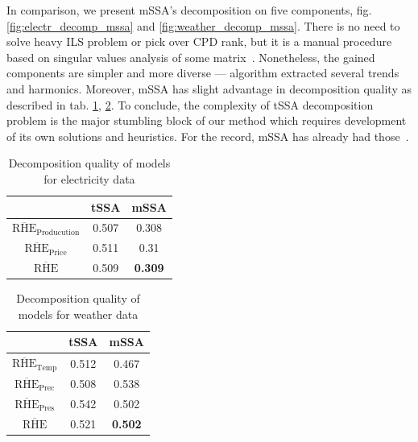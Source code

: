 	In comparison, we present mSSA's decomposition on five components,  fig. \ref{fig:electr_decomp_mssa} and \ref{fig:weather_decomp_mssa}. There is no need to solve heavy ILS problem or pick over CPD rank, but it is a manual procedure based on singular values analysis of some matrix~\cite{ecfb9dc578be43ae9ee8fc88b8ff9151}. Nonetheless, the gained  components are simpler and more diverse --- algorithm extracted several trends and harmonics. Moreover, mSSA has slight advantage in decomposition quality as described in tab. \ref{tab:decomp_electr_results}, \ref{tab:decomp_weather_results}. To conclude, the complexity of tSSA decomposition problem is the major stumbling block of our method which requires development of its own solutions and heuristics. For the record, mSSA has already had those~\cite{ecfb9dc578be43ae9ee8fc88b8ff9151}.
	
	\def\arraystretch{1.2}
	\begin{table}[h!]
		\centering
		\caption{Decomposition quality of models for electricity data}\label{tab:decomp_electr_results}
		\begin{tabular}{|c|c|c|}
			\hline
			& tSSA  & mSSA           \\ \hline
			$ \overline{\text{RHE}}_{\text{Producution}} $  & 0.507 & 0.308          \\ \hline
			$ \overline{\text{RHE}}_{\text{Price}} $      & 0.511 & 0.31           \\ \hline
			$ \overline{\text{RHE}} $             & 0.509 & \textbf{0.309} \\ \hline
		\end{tabular}
	\end{table}
	
	\def\arraystretch{1.2}
	\begin{table}[h!]
		\centering
		\caption{Decomposition quality of models for weather data}\label{tab:decomp_weather_results}
		\begin{tabular}{|c|c|c|}
			\hline
			& tSSA  & mSSA           \\ \hline
			$ \overline{\text{RHE}}_{\text{Temp}} $   & 0.512 & 0.467          \\ \hline
			$ \overline{\text{RHE}}_{\text{Prec}} $ & 0.508 & 0.538          \\ \hline
			$ \overline{\text{RHE}}_{\text{Pres}} $   & 0.542 & 0.502          \\ \hline
			$ \overline{\text{RHE}} $         & 0.521 & \textbf{0.502} \\ \hline
		\end{tabular}
	\end{table}	
	
